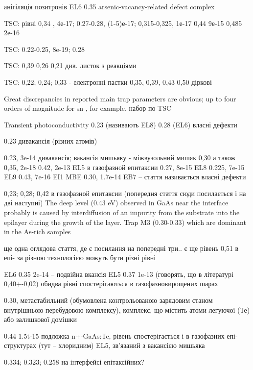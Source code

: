 \documentclass[a4paper,14pt,oneside,openany]{memoir}
\begin{document}
анігіляція позитронів
EL6
0.35 arsenic-vacancy-related defect complex \cite{EL6:Kuisma}

TSC:
рівні 0,34 , 4е-17;
0.27-0.28, (1-5)е-17;
0,315-0,325, 1е-17 
0,44 9е-15
0,485 2е-16\cite{Pavlovic:GaAs}

TSC:
0.22-0.25, 8e-19;
0.28 \cite{Lin:GaAs}

TSC:
0,39
0,26
0,21
див. листок з реакціями \cite{FANG1990}

TSC:
0,22; 0,24; 0,33 - електронні пастки
0,35, 0,39, 0,43 0,50 діркові \cite{Tomozane:GaAs}

Great discrepancies in reported main trap parameters are
obvious; up to four orders of magnitude for sn , for example,
набор по TSC\cite{Pavlovic2000}

Transient photoconductivity
0.23 (називають EL8)
0.28 (EL6)
власні дефекти \cite{Abele:GaAs}

0.23 дивакансія (різних атомів) \cite{Morrow:EL17}

0.23, 3e-14 дивакансія;
вакансія мишьяку -  міжвузольний мишяк 0,30 а також 0,35, 2e-18
0.42, 2e-13 EL5
в газофазной епитаксии
0.27, 8e-15 EL8
0.225, 7e-15 EL9
0.43, 7e-16 EI1
MBE
0.30, 1.7e-14 EB7  \cite{Bourgoin:GaAs} -- стаття називається власні дефекти

0,23; 0,28; 0,42 в газофазной епитаксии (попередня стаття сюди посилається і на дві наступні) \cite{Mircea1975}
The  deep  level  (0.43 eV) observed in GaAs near the interface probably is caused
by interdiffusion  of  an impurity from  the substrate into the  epilayer  during  the  growth  of the  layer. \cite{Lefevre1977}
Trap M3  (0.30-0.33)  which  are dominant  in the As-rich samples \cite{Lang:GaAs}

ще одна оглядова стаття, де є посилання на попередні три.. є ще рівень 0,51 \cite{Martin1977} в епі- за різною технологією можуть бути різні рівні

EL6 0.35 2e-14 -- подвійна вкансія
EL5 0.37 1e-13 (говорять, що в літературі 0,40+-0,02)
обидва рівні спостерігаються в газофазновирощених шарах \cite{Fang:EL6}


0.30, метастабильний (обумовлена контрольованою зарядовим станом внутрішньою перебудовою комплексу),
комплекс, що містить атоми легуючої (Те) або залишкової домішки \cite{KolFTP1994r}

0.44 1.5t-15 подложка n+-GaAs:Te,
рівень спостерігається і в газофазних епі-структурах (тут -- хлоридним)
EL5, зв'язаний з вакансією мишьяка \cite{KolFTP1989r}

0.334; 0.323; 0.258 на інтерфейсі епітаксійних? \cite{Yousefi1995}
\end{document}
